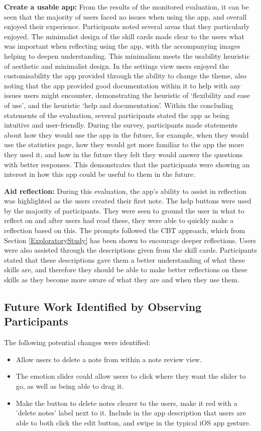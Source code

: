 \documentclass{l4proj}
\begin{document}
\textbf{Create a usable app:} From the results of the monitored evaluation, it can be seen that the majority of users faced no issues when using the app, and overall enjoyed their experience. Participants noted several areas that they particularly enjoyed. The minimalist design of the skill cards made clear to the users what was important when reflecting using the app, with the accompanying images helping to deepen understanding. This minimalism meets the usability heuristic of aesthetic and minimalist design. In the settings view users enjoyed the customisability the app provided through the ability to change the theme, also noting that the app provided good documentation within it to help with any issues users might encounter, demonstrating the heuristic of ‘flexibility and ease of use’, and the heuristic ‘help and documentation’. Within the concluding statements of the evaluation, several participants stated the app as being intuitive and user-friendly. During the survey, participants made statements about how they would use the app in the future, for example, when they would use the statistics page, how they would get more familiar to the app the more they used it, and how in the future they felt they would answer the questions with better responses. This demonstrates that the participants were showing an interest in how this app could be useful to them in the future.

\textbf{Aid reflection:} During this evaluation, the app's ability to assist in reflection was highlighted as the users created their first note. The help buttons were used by the majority of participants. They were seen to ground the user in what to reflect on and after users had read these, they were able to quickly make a reflection based on this. The prompts followed the CBT approach, which from Section \ref{ExploratoryStudy} has been shown to encourage deeper reflections. Users were also assisted through the descriptions given from the skill cards. Participants stated that these descriptions gave them a better understanding of what these skills are, and therefore they should be able to make better reflections on these skills as they become more aware of what they are and when they use them.

\subsection{Future Work Identified by Observing Participants}

The following potential changes were identified:
\begin{itemize}
    \item Allow users to delete a note from within a note review view.
    \item The emotion slider could allow users to click where they want the slider to go, as well as being able to drag it.
    \item Make the button to delete notes clearer to the users, make it red with a 'delete notes' label next to it. Include in the app description that users are able to both click the edit button, and swipe in the typical iOS app gesture.
\end{itemize}
\end{document}
